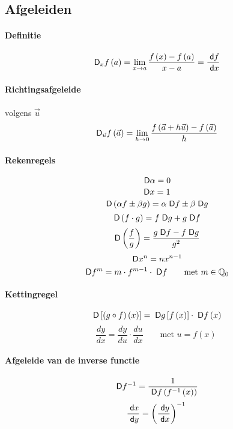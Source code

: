 \twocolumn
\subsection{Afgeleiden}
\label{sec:Afgeleiden}

\paragraph{Definitie}
\[
 \;\textsf{D}_x f \left( a \right) = \lim_{x \to a} \frac{ f\left(x\right) - f\left(a\right)}{x-a}
                         = \frac{ \;\textsf{d}f}{\;\textsf{d}x}
\]
\paragraph{Richtingsafgeleide} volgens $\vec{u}$
\[
 \;\textsf{D}_{\vec{u}} f \left( \vec{a} \right) = \lim_{h \to 0} \frac{ f\left(\vec{a} + h\vec{u}\right) - f\left(\vec{a}\right)}{h}
\]
\paragraph{Rekenregels}
\[
  \;\textsf{D} \alpha = 0
\]
\[
  \;\textsf{D} x = 1
\]
\[
  \;\textsf{D}\left(\alpha f \pm \beta g\right) = \alpha \;\textsf{D} f \pm \beta \;\textsf{D} g
\]
\[
  \;\textsf{D}\left(f \cdot g\right) = f\;\textsf{D} g + g\;\textsf{D} f
\]
\[
  \;\textsf{D}\left(\frac{f}{g}\right) = \frac{g\;\textsf{D} f - f\;\textsf{D} g}{g^2}
\]
\[
  \;\textsf{D} x^n = nx^{n-1}
\]
\[
  \;\textsf{D} f^m = m\cdot f^{m-1} \cdot \;\textsf{D} f \qquad \textrm{met $m \in \mathbb{Q}_0$}
\]
\paragraph{Kettingregel}
\[
  \;\textsf{D} \left[\left(g \circ f\right)\left(x\right)\right] = \;\textsf{D} g\left[f\left(x\right)\right] \cdot \;\textsf{D} f\left(x\right)
\]
\[
  \frac{dy}{dx} = \frac{dy}{du} \cdot \frac{du}{dx} \qquad \textrm{met $u = f\left(x\right)$}
\]
\paragraph{Afgeleide van de inverse functie}
\[
  \;\textsf{D} f^{-1} = \frac{1}{\;\textsf{D} f \left( f^{-1} \left( x \right) \right) }
\]
\[
  \frac{\;\textsf{d}x}{\;\textsf{d}y} = \left(\frac{\;\textsf{d}y}{\;\textsf{d}x} \right)^{-1}
\]
